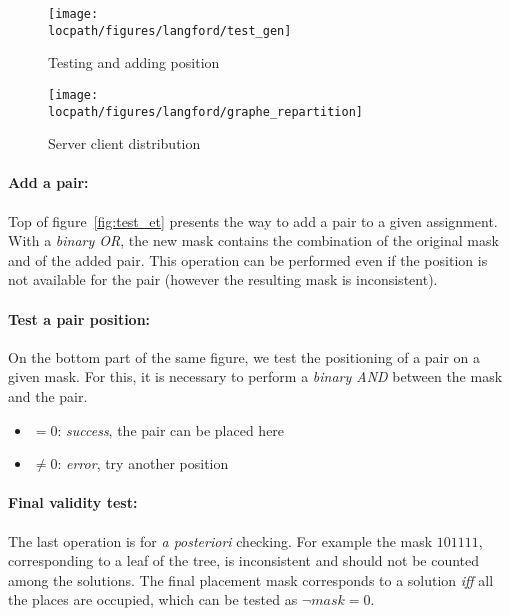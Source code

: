 \begin{figure}[t!]
\begin{minipage}[b]{0.5\linewidth}
\centering
\texttt{[image: \\locpath/figures/langford/test\_gen]}
\caption{Testing and adding position} \label{fig:test_et}
\end{minipage}
\begin{minipage}[b]{0.5\linewidth}
\centering 
\texttt{[image: \\locpath/figures/langford/graphe\_repartition]}   
\caption{Server client distribution} \label{fig:parallel} 
\end{minipage}
\end{figure}

\paragraph{Add a pair: }
Top of figure~\ref{fig:test_et} presents the way to add a pair to a given assignment.
With a \emph{binary OR}, the new mask contains the combination of the original mask and of the added pair.
This operation can be performed even if the position is not available for the pair (however the resulting mask is inconsistent). 

\paragraph{Test a pair position: }
On the bottom part of the same figure, we test the positioning of a pair on a given mask. 
For this, it is necessary to perform a \emph{binary AND} between the mask and the pair.
\begin{itemize}
	\item[] $=0$: \emph{success}, the pair can be placed here
	\item[] $\neq0$: \emph{error}, try another position
\end{itemize}

\paragraph{Final validity test: }
The last operation is for \emph{a posteriori} checking. For example the mask $101111$, corresponding to a leaf of the tree, is inconsistent and should not be counted among the solutions.
The final placement mask corresponds to a solution \emph{iff} all the places are occupied, which can be tested as $\neg mask = 0$. %
\\

